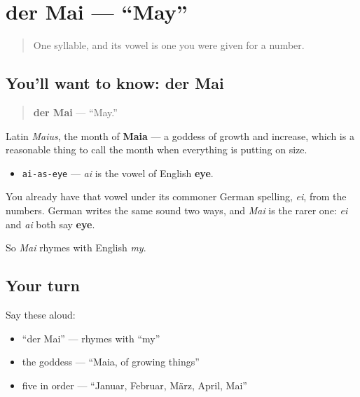 \section[der Mai]{der Mai — \textquotedblleft{}May\textquotedblright{}}

\label{lesson:GE-C09-mai}



\begin{quote}
One syllable, and its vowel is one you were given for a number.
\end{quote}

\subsection*{You'll want to know: der Mai}
\begin{quote}
\textbf{der Mai} — \textquotedblleft{}May.\textquotedblright{}
\end{quote}

Latin \emph{Maius}, the month of \textbf{Maia} — a goddess of growth and increase, which is a reasonable thing to call the month when everything is putting on size.

\begin{sounds}
\begin{itemize}
\raggedright
  \item \texttt{ai-as-eye} — \emph{ai} is the vowel of English \textbf{eye}.
\end{itemize}

You already have that vowel under its commoner German spelling, \emph{ei}, from the numbers. German writes the same sound two ways, and \emph{Mai} is the rarer one: \emph{ei} and \emph{ai} both say \textbf{eye}.

So \emph{Mai} rhymes with English \emph{my}.
\end{sounds}

\subsection*{Your turn}
Say these aloud:

\begin{itemize}
\raggedright
  \item \textquotedblleft{}der Mai\textquotedblright{} — rhymes with \textquotedblleft{}my\textquotedblright{}
  \item the goddess — \textquotedblleft{}Maia, of growing things\textquotedblright{}
  \item five in order — \textquotedblleft{}Januar, Februar, März, April, Mai\textquotedblright{}
\end{itemize}

